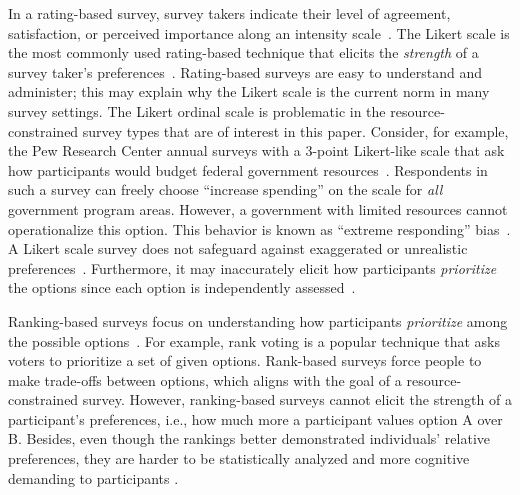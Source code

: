 {{In a rating-based survey, survey takers indicate their level of agreement, satisfaction, or perceived importance along an intensity scale~\cite{moors2016two}. The Likert scale is the most commonly used rating-based technique that elicits the \textit{strength} of a survey taker's preferences~\cite{likert1932technique}. Rating-based surveys are easy to understand and administer; this may explain why the Likert scale is the current norm in many survey settings. The Likert ordinal scale is problematic in the resource-constrained survey types that are of interest in this paper. Consider, for example, the Pew Research Center annual surveys with a 3-point Likert-like scale that ask how participants would budget federal government resources~\cite{pew_spending}. Respondents in such a survey can freely choose  ``increase spending'' on the scale for \textit{all} government program areas. However, a government with limited resources cannot operationalize this option. This behavior is known as ``extreme responding'' bias~\cite{batchelor2016extreme, furnham1986response, meisenberg2008acquiescent}. A Likert scale survey does not safeguard against exaggerated or unrealistic preferences~\cite{araujo2017much, vavreck2007exaggerated}. Furthermore, it may inaccurately elicit how participants \textit{prioritize} the options since each option is independently assessed~\cite{alwin1985measurement}. 

Ranking-based surveys focus on understanding how participants \textit{prioritize} among the possible options~\cite{moors2016two}. For example, rank voting \textcite{benade2020preference} is a popular technique that asks voters to prioritize a set of given options. Rank-based surveys force people to make trade-offs between options, which aligns with the goal of a resource-constrained survey. However, ranking-based surveys cannot elicit the strength of a participant’s preferences, i.e., how much more a participant values option A over B. Besides, even though the rankings better demonstrated individuals' relative preferences, they are harder to be statistically analyzed and more cognitive demanding to participants \cite{moors2016two}. 

}}
